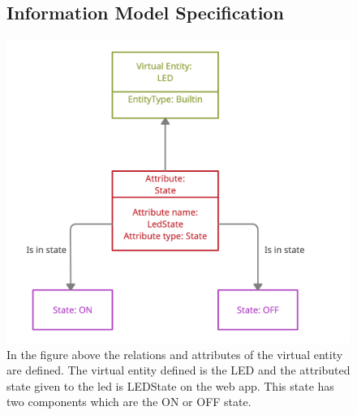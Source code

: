 \documentclass{report}
\begin{document}
\begin{figure}
\subsection{Information Model Specification}
    \centering
    \includegraphics[scale=0.2]{images/step4.png}
    \caption{ In the figure above the relations and attributes of the virtual entity are defined. The virtual entity defined is the LED and the attributed state given to the led is LEDState on the web app. This state has two components which are the ON or OFF state.}
    \label{fig:image3}
\end{figure}
\end{document}
